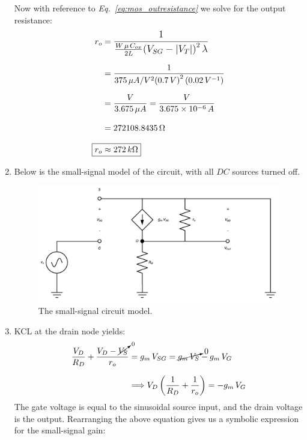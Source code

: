 \documentclass[12pt, fleqn]{article}
\begin{document}
\begin{enumerate}[label=(\alph*)]
    Now with reference to \textit{Eq.~\ref{eq:mos_outresistance}} we solve for the output resistance:
    \begin{align*}
        r_o &= \mathlarger{\frac{1}{\frac{W\,\mu\,C_{ox}}{2L}{(V_{SG} - \left|V_T\right|)}^2\,\lambda}}\\[0.25cm]
        &= \frac{1}{375\,\mu A/V^2{(0.7\,V)}^2\,(0.02\,V^{-1})}\\[0.25cm]
        &= \frac{V}{3.675\,\mu A} = \frac{V}{\num{3.675e-6}\,A}\\[0.25cm]
        &= 272108.8435\,\Omega\\[0.25cm]
        \Aboxed{r_o &\approx 272\,k \Omega}
    \end{align*}
    \newpage
    \item
    {
    Below is the small-signal model of the circuit, with all $DC$ sources turned off.
    \begin{figure}[H]
    \centering
    \includegraphics[scale=0.4]{p3b.png}
    \caption{The small-signal circuit model.}
    \label{fig:small_signal}
    \end{figure}
    }
    \item
    {
    KCL at the drain node yields:
    \begin{align*}
        \frac{V_D}{R_D} + \frac{V_D - \cancelto{0}{V_S}}{r_o} &= g_m\,V_{SG}
        = \cancelto{0}{g_m\,V_S} - g_m\,V_G\\[0.25cm]
        &\Longrightarrow V_D\left(\frac{1}{R_D} + \frac{1}{r_o}\right) = -g_m\,V_G
    \end{align*}
    The gate voltage is equal to the sinusoidal source input, and the drain voltage is the output.  Rearranging the above equation gives us a symbolic expression for the small-signal gain:
}
\end{enumerate}
\end{document}
